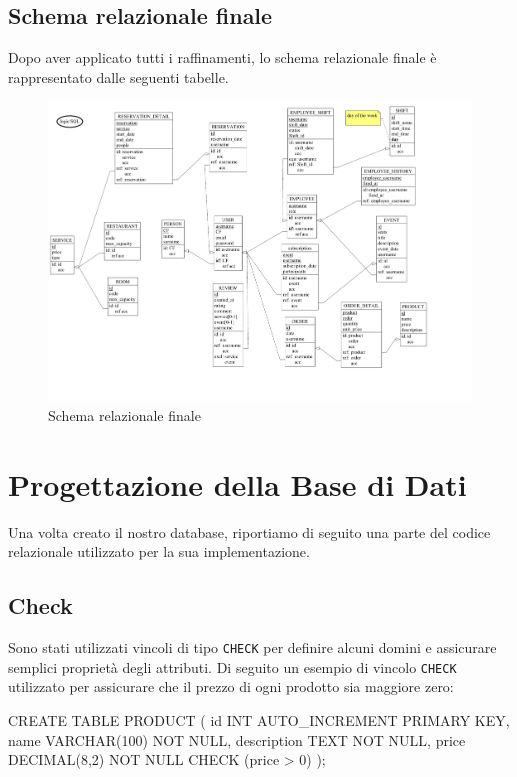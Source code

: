 \documentclass[a4paper,12pt]{report}
\begin{document}
\section{Schema relazionale finale}
Dopo aver applicato tutti i raffinamenti, lo schema relazionale
finale è rappresentato dalle seguenti tabelle.

\begin{figure}[H]
  \centering
  \includegraphics[width=\textwidth, trim=0 0 0 0]{./schemas/logic.pdf}
  \caption{Schema relazionale finale}
  \label{fig:schema-relazione}
\end{figure}
\newpage

\chapter{Progettazione della Base di Dati}
Una volta creato il nostro database, riportiamo di seguito una parte
del codice relazionale
utilizzato per la sua implementazione.

\section{Check}
Sono stati utilizzati vincoli di tipo \texttt{CHECK} per definire
alcuni domini e assicurare
semplici proprietà degli attributi. Di seguito un esempio di vincolo
\texttt{CHECK} utilizzato
per assicurare che il prezzo di ogni prodotto sia maggiore zero:

\begin{sqlcode}[caption={},label={lst:check}]
CREATE TABLE PRODUCT (
    id INT AUTO_INCREMENT PRIMARY KEY,
    name VARCHAR(100) NOT NULL,
    description TEXT NOT NULL,
    price DECIMAL(8,2) NOT NULL CHECK (price > 0)
);
\end{sqlcode}
\end{document}
